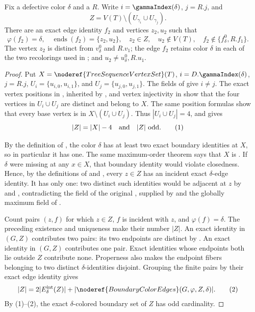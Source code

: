 \begin{helper}
Fix a defective color $\delta$ and a
 $R$.  Write
$i=\gammaIndex(\delta)$, $j=R.j$, and
\[
 Z=V(T)\setminus(U_{\gamma_i}\cup U_{\gamma_j}).
\]
There are an exact edge identity $f_2$ and vertices $z_2,u_2$ such that
\[
 \varphi(f_2)=\delta,\quad
 \operatorname{ends}(f_2)=\{z_2,u_2\},\quad
 z_2\in Z,\quad u_2\notin V(T),\quad
 f_2\notin\{f^0_\delta,R.f_1\}.
\]
The vertex $z_2$ is distinct from $v^0_\delta$ and $R.v_1$; the edge
$f_2$ retains color $\delta$ in each of the two recolorings used in
; and
$u_2\ne u^0_\delta,R.u_1$.
\end{helper}
\begin{proof}
Put $X=\noderef{TreeSequenceVertexSet}(T)$, $i=D.\gammaIndex(\delta)$,
$j=R.j$, $U_i=\{u_{i,0},u_{i,1}\}$, and
$U_j=\{u_{j,0},u_{j,1}\}$.  The fields of
 give $i\ne j$.  The exact vertex
positions in , inherited by
, and vertex injectivity in
 show that the four vertices in $U_i\cup U_j$ are
distinct and belong to $X$.  The same position formulas show that every
base vertex is in $X\setminus(U_i\cup U_j)$.  Thus
$|U_i\cup U_j|=4$, and
 gives
\[
 |Z|=|X|-4\quad\hbox{and}\quad |Z|\text{ odd}.
 \tag{1}
\]

By the definition of , the color $\delta$ has
at least two exact boundary identities at $X$, so in particular it has
one.  The same maximum-order theorem says that $X$ is
.  If $\delta$ were missing at any
$x\in X$, that boundary identity would violate closedness.  Hence, by
the definitions of  and
, every $z\in Z$ has an incident exact
$\delta$-edge identity.  It has only one: two distinct such identities
would be adjacent at $z$ by  and
, contradicting the 
field of the original , supplied by
 and the globally maximum field of
.

Count pairs $(z,f)$ for which $z\in Z$, $f$ is incident with $z$, and
$\varphi(f)=\delta$.  The preceding existence and uniqueness make their
number $|Z|$.  An exact identity in
$(G,Z)$ contributes two pairs: its two endpoints
are distinct by .  An exact identity in
$(G,Z)$ contributes one pair.  Exact identities
whose endpoints both lie outside $Z$ contribute none.  Properness also
makes the endpoint fibers belonging to two distinct $\delta$-identities
disjoint.  Grouping the finite pairs by their exact edge identity gives
\[
 |Z|=2|E^{\rm int}_\delta(Z)|+
   |\noderef{BoundaryColorEdges}(G,\varphi,Z,\delta)|.
 \tag{2}
\]
By (1)--(2), the exact $\delta$-colored boundary set of $Z$ has odd
cardinality.


\end{proof}
